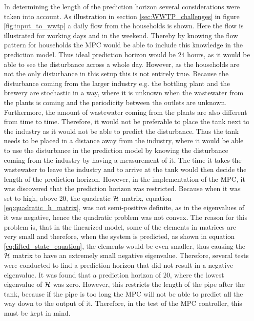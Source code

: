 In determining the length of the prediction horizon several considerations were taken into account. As illustration in section \ref{sec:WWTP_challenges} in figure \ref{fig:input_to_wwtp} a daily flow from the households is shown. Here the flow is illustrated for working days and in the weekend. Thereby by knowing the flow pattern for households the MPC would be able to include this knowledge in the prediction model. Thus ideal prediction horizon would be 24 hours, as it would be able to see the disturbance across a whole day. However, as the households are not the only disturbance in this setup this is not entirely true. Because the disturbance coming from the larger industry e.g. the bottling plant and the brewery are stochastic in a way, where it is unknown when the wastewater from the plants is coming and the periodicity between the outlets are unknown. Furthermore, the amount of wastewater coming from the plants are also different from time to time. Therefore, it would not be preferable to place the tank next to the industry as it would not be able to predict the disturbance. Thus the tank needs to be placed in a distance away from the industry, where it would be able to use the disturbance in the prediction model by knowing the disturbance coming from the industry by having a measurement of it. The time it takes the wastewater to leave the industry and to arrive at the tank would then decide the length of the prediction horizon. However, in the implementation of the MPC, it was discovered that the prediction horizon was restricted. Because when it was set to high, above 20, the quadratic $\CMcal{H}$ matrix, equation \ref{eq:quadratic_h_matrix}, was not semi-positive definite, as in the eigenvalues of it was negative, hence the quadratic problem was not convex. The reason for this problem is, that in the linearized model, some of the elements in matrices are very small and therefore, when the system is predicted, as shown in equation \ref{eq:lifted_state_equation}, the elements would be even smaller, thus causing the $\CMcal{H}$ matrix to have an extremely small negative eigenvalue. Therefore, several tests were conducted to find a prediction horizon that did not result in a negative eigenvalue. It was found that a prediction horizon of 20, where the lowest eigenvalue of $\CMcal{H}$ was zero. However, this restricts the length of the pipe after the tank, because if the pipe is too long the MPC will not be able to predict all the way down to the output of it. Therefore, in the test of the MPC controller, this must be kept in mind.   


